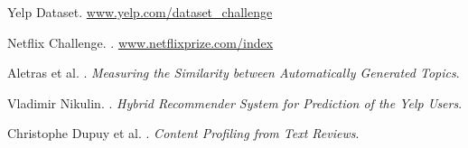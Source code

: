 \documentclass[11pt]{article}
\begin{document}



\begin{thebibliography}{}
	
	
	Yelp Dataset.
	\newblock \href{www.yelp.com/dataset_challenge}{www.yelp.com/dataset\_challenge}
	
Netflix Challenge.
.
\newblock \href{www.netflixprize.com/index}{www.netflixprize.com/index}
	
Aletras et al.
.
\newblock \textit{Measuring the Similarity between Automatically Generated Topics}.

Vladimir Nikulin.
.
\newblock \textit{Hybrid Recommender System for Prediction of the Yelp Users}.

Christophe Dupuy et al.
.
\newblock \textit{Content Profiling from Text Reviews}.




\end{thebibliography}
\end{document}
